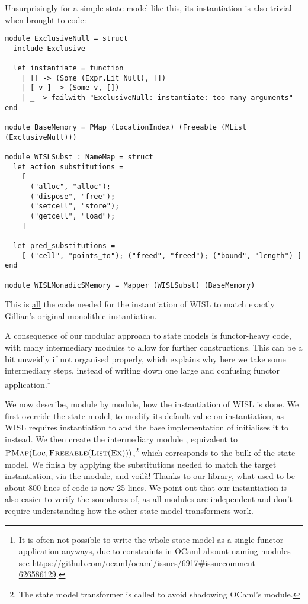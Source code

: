 Unsurprisingly for a simple state model like this, its instantiation is also trivial when brought to code: \begin{lstlisting}
module ExclusiveNull = struct
  include Exclusive

  let instantiate = function
    | [] -> (Some (Expr.Lit Null), [])
    | [ v ] -> (Some v, [])
    | _ -> failwith "ExclusiveNull: instantiate: too many arguments"
end

module BaseMemory = PMap (LocationIndex) (Freeable (MList (ExclusiveNull)))

module WISLSubst : NameMap = struct
  let action_substitutions =
    [
      ("alloc", "alloc");
      ("dispose", "free");
      ("setcell", "store");
      ("getcell", "load");
    ]

  let pred_substitutions =
    [ ("cell", "points_to"); ("freed", "freed"); ("bound", "length") ]
end

module WISLMonadicSMemory = Mapper (WISLSubst) (BaseMemory)
\end{lstlisting}
This is \underline{all} the code needed for the instantiation of WISL to match exactly Gillian's original monolithic instantiation.

A consequence of our modular approach to state models is functor-heavy code, with many intermediary modules to allow for further constructions. This can be a bit unweidly if not organised properly, which explains why here we take some intermediary steps, instead of writing down one large and confusing functor application.\footnote{It is often not possible to write the whole state model as a single functor application anyways, due to constraints in OCaml abount naming modules -- see \url{https://github.com/ocaml/ocaml/issues/6917\#issuecomment-626586129}.}

We now describe, module by module, how the instantiation of WISL is done. We first override the \Ex{} state model, to modify its default value on instantiation, as WISL requires instantiation to  and the base implementation of \Ex{} initialises it to  instead. We then create the intermediary module , equivalent to $\textsc{PMap}(\text{Loc},\textsc{Freeable}(\textsc{List}(\textsc{Ex})))$,\footnote{The \List{} state model transformer is called  to avoid shadowing OCaml's  module.} which corresponds to the bulk of the state model. We finish by applying the substitutions needed to match the target instantiation, via the  module, and voilà! Thanks to our library, what used to be about 800 lines of code is now 25 lines. We point out that our instantiation is also easier to verify the soundness of, as all modules are independent and don't require understanding how the other state model transformers work.


